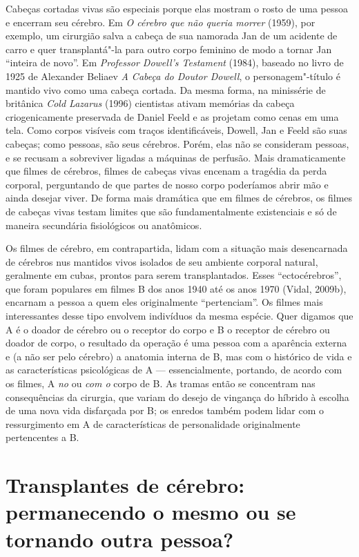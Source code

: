 Cabeças cortadas vivas são especiais porque elas mostram o rosto de uma
pessoa e encerram seu cérebro. Em \emph{O cérebro que não queria morrer}
(1959), por exemplo, um cirurgião salva a cabeça de sua namorada Jan de
um acidente de carro e quer transplantá"-la para outro corpo feminino de
modo a tornar Jan ``inteira de novo''. Em \emph{Professor Dowell's
Testament} (1984), baseado no livro de 1925 de Alexander Beliaev \emph{A
Cabeça do Doutor Dowell}, o personagem"-título é mantido vivo como uma
cabeça cortada. Da mesma forma, na minissérie de  britânica \emph{Cold
Lazarus} (1996) cientistas ativam memórias da cabeça criogenicamente
preservada de Daniel Feeld e as projetam como cenas em uma tela. Como
corpos visíveis com traços identificáveis, Dowell, Jan e Feeld são suas
cabeças; como pessoas, são seus cérebros. Porém, elas não se consideram
pessoas, e se recusam a sobreviver ligadas a máquinas de perfusão. Mais
dramaticamente que filmes de cérebros, filmes de cabeças vivas encenam a
tragédia da perda corporal, perguntando de que partes de nosso corpo
poderíamos abrir mão e ainda desejar viver. De forma mais dramática que
em filmes de cérebros, os filmes de cabeças vivas testam limites que são
fundamentalmente existenciais e só de maneira secundária fisiológicos ou
anatômicos.

Os filmes de cérebro, em contrapartida, lidam com a situação mais
desencarnada de cérebros nus mantidos vivos isolados de seu ambiente
corporal natural, geralmente em cubas, prontos para serem
transplantados. Esses ``ectocérebros'', que foram populares em filmes B
dos anos 1940 até os anos 1970 (Vidal, 2009b), encarnam a pessoa a quem
eles originalmente ``pertenciam''. Os filmes mais interessantes desse
tipo envolvem indivíduos da mesma espécie. Quer digamos que A é o doador
de cérebro ou o receptor do corpo e B o receptor de cérebro ou doador de
corpo, o resultado da operação é uma pessoa com a aparência externa e (a
não ser pelo cérebro) a anatomia interna de B, mas com o histórico de
vida e as características psicológicas de A --- essencialmente,
portando, de acordo com os filmes, A \emph{no} ou \emph{com o} corpo de
B. As tramas então se concentram nas consequências da cirurgia, que
variam do desejo de vingança do híbrido à escolha de uma nova vida
disfarçada por B; os enredos também podem lidar com o ressurgimento em A
de características de personalidade originalmente pertencentes a B.

\chapter{Transplantes de cérebro: permanecendo o mesmo ou se tornando outra
pessoa?}

